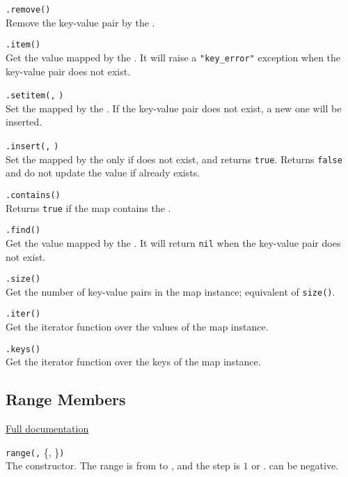 \hangpar {}\texttt{.remove(}\texttt{)}\\
Remove the key-value pair by the .

\hangpar {}\texttt{.item(}\texttt{)}\\
Get the value mapped by the . It will raise a \texttt{"key\_error"} exception when the key-value pair does not exist.

\hangpar {}\texttt{.setitem(}\texttt{,} \texttt{)}\\
Set the  mapped by the . If the key-value pair does not exist, a new one will be inserted.

\hangpar {}\texttt{.insert(}\texttt{,} \texttt{)}\\
Set the  mapped by the  only if  does not exist, and returns \texttt{true}. Returns \texttt{false} and do not update the value if  already exists.

\hangpar {}\texttt{.contains(}\texttt{)}\\
Returns \texttt{true} if the map contains the .

\hangpar {}\texttt{.find(}\texttt{)}\\
Get the value mapped by the . It will return \texttt{nil} when the key-value pair does not exist.

\hangpar {}\texttt{.size()}\\
Get the number of key-value pairs in the map instance; equivalent of \texttt{size(}\texttt{)}.

\hangpar {}\texttt{.iter()}\\
Get the iterator function over the values of the map instance. 

\hangpar {}\texttt{.keys()}\\
Get the iterator function over the keys of the map instance. 

\subsection*{Range Members}

\hangpar \href{https://github.com/berry-lang/berry/wiki/Chapter-7\#range-class}{Full documentation}

\hangpar \texttt{range(}\texttt{,} \{, \}\texttt{)}\\
The constructor. The range is from  to , and the step is $1$ or .  can be negative.

